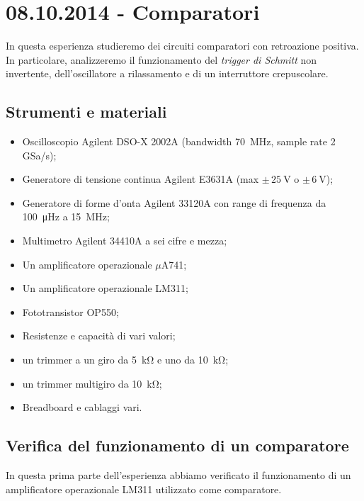\section{08.10.2014 - Comparatori}

In questa esperienza studieremo dei circuiti comparatori con retroazione positiva. In particolare, analizzeremo il funzionamento del \textit{trigger di Schmitt} non invertente, dell'oscillatore a rilassamento e di un interruttore crepuscolare.

\subsection*{Strumenti e materiali}

\begin{itemize} [noitemsep]
\item Oscilloscopio Agilent DSO-X 2002A (bandwidth \SI{70}{\mega\hertz}, sample rate \num{2} GSa/s);
\item Generatore di tensione continua Agilent E3631A (max $\pm \, \SI{25}{\volt}$ o $\pm \, \SI{6}{\volt}$);
\item Generatore di forme d'onta Agilent 33120A con range di frequenza da \SI{100}{\micro\hertz} a \SI{15}{\mega\hertz};
\item Multimetro Agilent 34410A a sei cifre e mezza;
\item Un amplificatore operazionale $\mu$A741;
\item Un amplificatore operazionale LM311;
\item Fototransistor OP550;
\item Resistenze e capacità di vari valori;
\item un trimmer a un giro da \SI{5}{\kilo\ohm} e uno da \SI{10}{\kilo\ohm};
\item un trimmer multigiro da \SI{10}{\kilo\ohm};
\item Breadboard e cablaggi vari.
\end{itemize}

\subsection{Verifica del funzionamento di un comparatore}

In questa prima parte dell'esperienza abbiamo verificato il funzionamento di un amplificatore operazionale LM311 utilizzato come comparatore.


